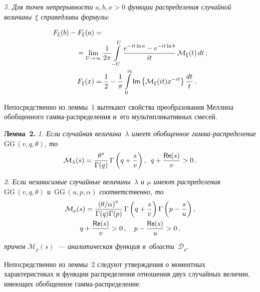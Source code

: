 \begin{multicols}{2}
\textit{5.
Для точек непрерывности $a, b, x > 0$ функции распределения случайной величины~$\xi$ справедливы формулы}:

\vspace*{-2pt}

\noindent
\begin{align*}
F_\xi(b) - F_\xi(a) &={}\\
&\hspace*{-9mm}{}= \lim_{U\to\infty}\fr{1}{2\pi}\int\limits_{-U}^{U} 
\fr{e^{-it\ln a}-e^{-it\ln b}}{it}\,\mathcal{M}_{\xi}(t)\,dt\,;
\\
F_\xi(x) &= \fr{1}{2}-\fr{1}{\pi}\int\limits_0^{\infty}{\sf Im}
\left\{\mathcal{M}_{\xi}(it)x^{-it}\right\}\fr{dt}{t}\,.
\end{align*}

\vspace*{-2pt}

Непосредственно из леммы~1 вытекают свойства преобразования Меллина 
обобщенного гам\-ма-рас\-пре\-де\-ле\-ния и~его мультипликативных смесей.

\smallskip

\noindent
\textbf{Лемма~2.} %
\textit{1. Если случайная величина~$\lambda$ имеет обобщенное гам\-ма-рас\-пре\-де\-ле\-ние 
$\mathrm{GG}\,(v,q,\theta)$, то}
$$
\mathcal{M}_\lambda(s) = \displaystyle\frac{\displaystyle \theta^s\mathstrut}{\displaystyle \Gamma(q)\mathstrut}\,\Gamma\left(q+\displaystyle\frac{\displaystyle s\mathstrut}{\displaystyle v\mathstrut}\right), \enskip
q+\displaystyle\frac{\displaystyle {\sf Re} (s)\mathstrut}{\displaystyle v\mathstrut}>0\,.
$$

\textit{2. Если независимые случайные величины~$\lambda$ и $\mu$ имеют распределения 
$\mathrm{GG}\,(v, q, \theta)$ 
и~$\mathrm{GG}\,(u, p, \alpha)$ соответственно,  то}
\begin{multline*}
\mathcal{M}_{\rho}(s) = \displaystyle\frac{\displaystyle \left(\theta/ \alpha\right)^s\mathstrut}{\displaystyle \Gamma(q)\Gamma(p)\mathstrut}\,
\Gamma\left(q+\displaystyle\frac{\displaystyle s\mathstrut}{\displaystyle v\mathstrut}\right)\Gamma\left(p-\displaystyle\frac{\displaystyle s\mathstrut}{\displaystyle u\mathstrut}\right), \\
 q+ \displaystyle\frac{\displaystyle {\sf Re} (s)\mathstrut}{\displaystyle v\mathstrut}>0\,, \quad p-\displaystyle\frac{\displaystyle {\sf Re} (s)\mathstrut}{\displaystyle u\mathstrut}>0\,,
 \end{multline*}
\textit{причем $\mathcal{M}_{\rho}(s)$~--- аналитическая функция в~об\-ласти~$\mathcal{D}_\rho$}.

\smallskip

Непосредственно из леммы~2 следуют утверждения о моментных характеристиках и функции 
распределения отношения двух случайных величин, имеющих обобщенное гам\-ма-рас\-пре\-де\-ле\-ние.

\smallskip


\end{multicols}
